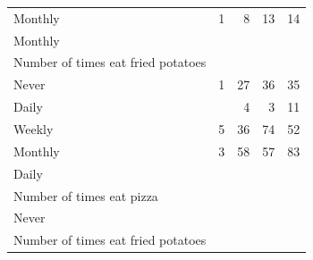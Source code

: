 \documentclass{article}
\begin{document}
\begin{table}[!h]
{\begin{tabular}{lllll}
			\multicolumn{1}{l}{\hspace{5em}Monthly} &
			\multicolumn{1}{|r}{1} &
			\multicolumn{1}{r}{8} &
			\multicolumn{1}{r}{13} &
			\multicolumn{1}{r}{14} \\
			\multicolumn{1}{l}{\hspace{3em}Monthly} &
			\multicolumn{1}{|r}{} &
			\multicolumn{1}{r}{} &
			\multicolumn{1}{r}{} &
			\multicolumn{1}{r}{} \\
			\multicolumn{1}{l}{\hspace{4em}Number of times eat fried potatoes} &
			\multicolumn{1}{|r}{} &
			\multicolumn{1}{r}{} &
			\multicolumn{1}{r}{} &
			\multicolumn{1}{r}{} \\
			\multicolumn{1}{l}{\hspace{5em}Never} &
			\multicolumn{1}{|r}{1} &
			\multicolumn{1}{r}{27} &
			\multicolumn{1}{r}{36} &
			\multicolumn{1}{r}{35} \\
			\multicolumn{1}{l}{\hspace{5em}Daily} &
			\multicolumn{1}{|r}{} &
			\multicolumn{1}{r}{4} &
			\multicolumn{1}{r}{3} &
			\multicolumn{1}{r}{11} \\
			\multicolumn{1}{l}{\hspace{5em}Weekly} &
			\multicolumn{1}{|r}{5} &
			\multicolumn{1}{r}{36} &
			\multicolumn{1}{r}{74} &
			\multicolumn{1}{r}{52} \\
			\multicolumn{1}{l}{\hspace{5em}Monthly} &
			\multicolumn{1}{|r}{3} &
			\multicolumn{1}{r}{58} &
			\multicolumn{1}{r}{57} &
			\multicolumn{1}{r}{83} \\
			\multicolumn{1}{l}{\hspace{1em}Daily} &
			\multicolumn{1}{|r}{} &
			\multicolumn{1}{r}{} &
			\multicolumn{1}{r}{} &
			\multicolumn{1}{r}{} \\
			\multicolumn{1}{l}{\hspace{2em}Number of times eat pizza} &
			\multicolumn{1}{|r}{} &
			\multicolumn{1}{r}{} &
			\multicolumn{1}{r}{} &
			\multicolumn{1}{r}{} \\
			\multicolumn{1}{l}{\hspace{3em}Never} &
			\multicolumn{1}{|r}{} &
			\multicolumn{1}{r}{} &
			\multicolumn{1}{r}{} &
			\multicolumn{1}{r}{} \\
			\multicolumn{1}{l}{\hspace{4em}Number of times eat fried potatoes} &
			\multicolumn{1}{|r}{} &
			\multicolumn{1}{r}{} &
			\multicolumn{1}{r}{} &
			\multicolumn{1}{r}{} \\

\end{tabular}}
\end{table}
\end{document}
